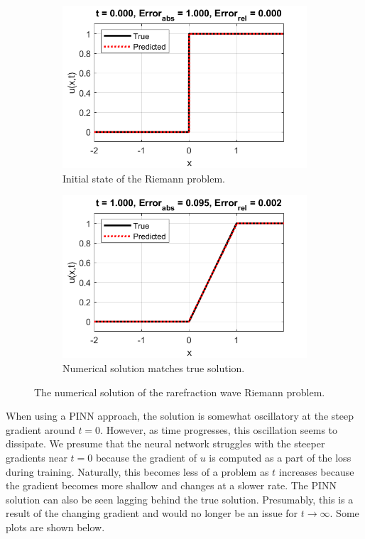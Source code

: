 \documentclass{myproject}
\begin{document}
\begin{figure}
\centering
    \begin{subfigure}{.48\textwidth}
        \centering
        \includegraphics[width=1.0\textwidth]{t0_rarefraction.png}
        \caption{Initial state of the Riemann problem.}
    \end{subfigure}\hfill
    \begin{subfigure}{.48\textwidth}
        \centering
        \includegraphics[width=1\textwidth]{t1_rarefraction.png}
        \caption{Numerical solution matches true solution.}
    \end{subfigure}
    \caption{The numerical solution of the rarefraction wave Riemann problem.}
\end{figure}

When using a PINN approach, the solution is somewhat oscillatory at the steep gradient around $t=0$. However, as time progresses, this oscillation seems to dissipate. We presume that the neural network struggles with the steeper gradients near $t=0$ because the gradient of $u$ is computed as a part of the loss during training. Naturally, this becomes less of a problem as $t$ increases because the gradient becomes more shallow and changes at a slower rate. The PINN solution can also be seen lagging behind the true solution. Presumably, this is a result of the changing gradient and would no longer be an issue for $t \rightarrow \infty $. Some plots are shown below.
\end{document}
